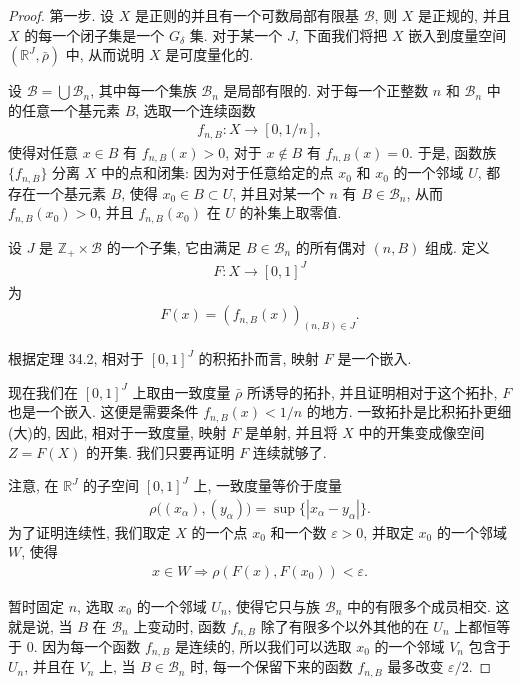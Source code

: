 \documentclass[../../main.tex]{subfiles}
\begin{document}
\begin{proof}
第一步. 设 $X$ 是正则的并且有一个可数局部有限基 $\mathcal{B}$, 则 $X$ 是正规的, 并且 $X$ 的每一个闭子集是一个 $G_\delta$ 集. 对于某一个 $J$, 下面我们将把 $X$ 嵌入到度量空间 $(\mathbb{R}^J,\bar{\rho})$ 中, 从而说明 $X$ 是可度量化的.

设 $\mathcal{B}=\bigcup\mathcal{B}_n$, 其中每一个集族 $\mathcal{B}_n$ 是局部有限的. 对于每一个正整数 $n$ 和 $\mathcal{B}_n$ 中的任意一个基元素 $B$, 选取一个连续函数
\begin{align*}
f_{n,B}\colon X\longrightarrow[0,1/n],
\end{align*}
使得对任意 $x\in B$ 有 $f_{n,B}(x)>0$, 对于 $x\notin B$ 有 $f_{n,B}(x)=0$. 于是, 函数族 $\{f_{n,B}\}$ 分离 $X$ 中的点和闭集: 因为对于任意给定的点 $x_0$ 和 $x_0$ 的一个邻域 $U$, 都存在一个基元素 $B$, 使得 $x_0\in B\subset U$, 并且对某一个 $n$ 有 $B\in\mathcal{B}_n$, 从而 $f_{n,B}(x_0)>0$, 并且 $f_{n,B}(x_0)$ 在 $U$ 的补集上取零值.

设 $J$ 是 $\mathbb{Z}_+\times\mathcal{B}$ 的一个子集, 它由满足 $B\in\mathcal{B}_n$ 的所有偶对 $(n,B)$ 组成. 定义
\begin{align*}
F\colon X\longrightarrow[0,1]^J
\end{align*}
为
\begin{align*}
F(x)=(f_{n,B}(x))_{(n,B)\in J}.
\end{align*}

根据定理 34.2, 相对于 $[0,1]^J$ 的积拓扑而言, 映射 $F$ 是一个嵌入.

现在我们在 $[0,1]^J$ 上取由一致度量 $\bar{\rho}$ 所诱导的拓扑, 并且证明相对于这个拓扑, $F$ 也是一个嵌入. 这便是需要条件 $f_{n,B}(x)<1/n$ 的地方. 一致拓扑是比积拓扑更细(大)的, 因此, 相对于一致度量, 映射 $F$ 是单射, 并且将 $X$ 中的开集变成像空间 $Z=F(X)$ 的开集. 我们只要再证明 $F$ 连续就够了.

注意, 在 $\mathbb{R}^J$ 的子空间 $[0,1]^J$ 上, 一致度量等价于度量
\begin{align*}
\rho\bigl((x_\alpha),(y_\alpha)\bigr)=\sup\{|x_\alpha-y_\alpha|\}.
\end{align*}
为了证明连续性, 我们取定 $X$ 的一个点 $x_0$ 和一个数 $\varepsilon>0$, 并取定 $x_0$ 的一个邻域 $W$, 使得
\begin{align*}
x\in W\Longrightarrow\rho(F(x),F(x_0))<\varepsilon.
\end{align*}

暂时固定 $n$, 选取 $x_0$ 的一个邻域 $U_n$, 使得它只与族 $\mathcal{B}_n$ 中的有限多个成员相交. 这就是说, 当 $B$ 在 $\mathcal{B}_n$ 上变动时, 函数 $f_{n,B}$ 除了有限多个以外其他的在 $U_n$ 上都恒等于 $0$. 因为每一个函数 $f_{n,B}$ 是连续的, 所以我们可以选取 $x_0$ 的一个邻域 $V_n$ 包含于 $U_n$, 并且在 $V_n$ 上, 当 $B\in\mathcal{B}_n$ 时, 每一个保留下来的函数 $f_{n,B}$ 最多改变 $\varepsilon/2$.


\end{proof}
\end{document}
